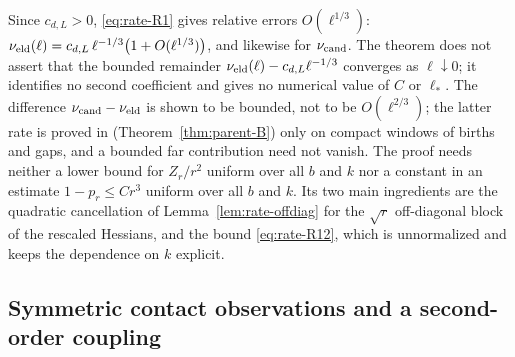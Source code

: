 \begin{remark}\label{rem:rate-scope}
Since $c_{d,L}>0$, \eqref{eq:rate-R1} gives relative errors $O(\ell^{1/3})$: $\nu_{\mathrm{eld}}(\ell)=c_{d,L}\,\ell^{-1/3}\bigl(1+O(\ell^{1/3})\bigr)$, and likewise for $\nu_{\mathrm{cand}}$. The theorem does not assert that the bounded remainder $\nu_{\mathrm{eld}}(\ell)-c_{d,L}\ell^{-1/3}$ converges as $\ell\downarrow0$; it identifies no second coefficient and gives no numerical value of $C$ or $\ell_*$. The difference $\nu_{\mathrm{cand}}-\nu_{\mathrm{eld}}$ is shown to be bounded, not to be $O(\ell^{2/3})$; the latter rate is proved in \cite[Theorem~B]{parentP} (Theorem~\ref{thm:parent-B}) only on compact windows of births and gaps, and a bounded far contribution need not vanish. The proof needs neither a lower bound for $Z_r/r^2$ uniform over all $b$ and $k$ nor a constant in an estimate $1-p_r\le Cr^3$ uniform over all $b$ and $k$. Its two main ingredients are the quadratic cancellation of Lemma~\ref{lem:rate-offdiag} for the $\sqrt r$ off-diagonal block of the rescaled Hessians, and the bound \eqref{eq:rate-R12}, which is unnormalized and keeps the dependence on $k$ explicit.
\end{remark}

\subsection*{Symmetric contact observations and a second-order coupling}

